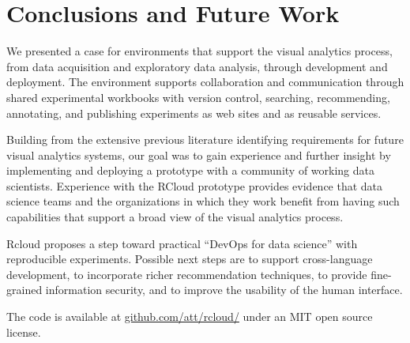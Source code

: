 \section{Conclusions and Future Work}

We presented a case for environments that support the visual
analytics process, from data acquisition and exploratory
data analysis, through development and deployment.
The environment supports collaboration and communication
through shared experimental workbooks with version control,
searching, recommending, annotating, and publishing
experiments as web sites and as reusable services. 

Building from the extensive previous literature identifying
requirements for future visual analytics systems, our goal was
to gain experience and further insight by implementing and
deploying a prototype with a community of working data scientists.
Experience with the RCloud prototype provides evidence that data
science teams and the organizations in which they work
benefit from having such capabilities that support a
broad view of the visual analytics process.

Rcloud proposes a step toward practical ``DevOps for data
science'' with reproducible experiments.
Possible next steps are to support cross-language development,
to incorporate richer recommendation techniques, to provide fine-grained
information security, and to improve the usability of the human interface.

The code is available 
at \url{github.com/att/rcloud/}
under an MIT open source license.
